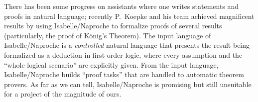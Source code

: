 There has been some progress on assistants where one writes statements
and proofs in natural language; recently P.~Koepke and his team
achieved magnificent results by using Isabelle/Naproche
\cite{10.1007/978-3-030-81097-9_2} to formalize proofs of several
results (particularly, the proof of König's Theorem). The input
language of Isabelle/Naproche is a \emph{controlled} natural language
that presents the result being formalized as a deduction in
first-order logic, where every assumption and the ``whole logical
scenario'' are explicitly given. From the input language,
Isabelle/Naproche builds ``proof tasks'' that are handled to automatic
theorem provers. As far as we can tell, Isabelle/Naproche is
promising but still unsuitable for a project of the magnitude of ours.


